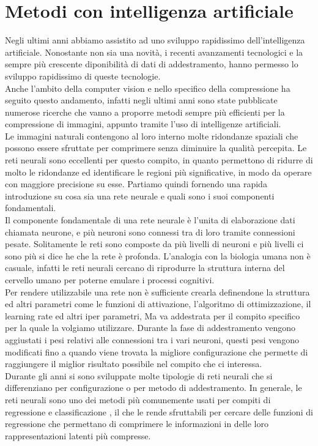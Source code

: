 \chapter{Metodi con intelligenza artificiale}
Negli ultimi anni abbiamo assistito ad uno sviluppo rapidissimo dell’intelligenza artificiale. Nonostante non sia una novità, i recenti avanzamenti tecnologici e la sempre più crescente diponibilità di dati di addestramento, hanno permesso lo sviluppo rapidissimo di queste tecnologie.\\
Anche l’ambito della computer vision e nello specifico della compressione ha seguito questo andamento, infatti negli ultimi anni sono state pubblicate numerose ricerche che vanno a proporre metodi sempre più efficienti per la compressione di immagini, appunto tramite l’uso di intelligenze artificiali.\\
Le immagini naturali contengono al loro interno molte ridondanze spaziali che possono essere sfruttate per comprimere senza diminuire la qualità percepita. Le reti neurali sono eccellenti per questo compito, in quanto permettono di ridurre di molto le ridondanze ed identificare le regioni più significative, in modo da operare con maggiore precisione su esse.
Partiamo quindi fornendo una rapida introduzione su cosa sia una rete neurale e quali sono i suoi componenti fondamentali.\\
Il componente fondamentale di una rete neurale è l’unita di elaborazione dati chiamata neurone, e più neuroni sono connessi tra di loro tramite connessioni pesate. Solitamente le reti sono composte da più livelli di neuroni e più livelli ci sono più si dice he che la rete è profonda. L’analogia con la biologia umana non è casuale, infatti le reti neurali cercano di riprodurre la struttura interna del cervello umano per poterne emulare i processi cognitivi. \cite{sadeeq2021image}\\
Per rendere utilizzabile una rete non è sufficiente crearla definendone la struttura ed altri parametri come le funzioni di attivazione, l’algoritmo di ottimizzazione, il learning rate ed altri iper parametri, Ma va addestrata per il compito specifico per la quale la volgiamo utilizzare. Durante la fase di addestramento vengono aggiustati i pesi relativi alle connessioni tra i vari neuroni, questi pesi vengono modificati fino a quando viene trovata la migliore configurazione che permette di raggiungere il miglior risultato possibile nel compito che ci interessa.\\
Durante gli anni si sono sviluppate molte tipologie di reti neurali che si differenziano per configurazione o per metodo di addestramento. In generale, le reti neurali sono uno dei metodi più comunemente usati per compiti di regressione e classificazione \cite{sadeeq2021image}, il che le rende sfruttabili per cercare delle funzioni di regressione che permettano di comprimere le informazioni in delle loro rappresentazioni latenti più compresse.
